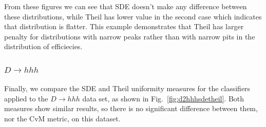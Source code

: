 From these figures we can see that SDE doesn't make any difference between these distributions, while Theil has lower value in the second case 
which indicates that distribution is flatter. This example demonstrates that Theil has larger penalty for distributions with narrow peaks rather than with narrow pits in the distribution of efficiecies.

\subsubsection*{$D \to hhh$}
Finally, we compare the SDE and Theil uniformity measures for the classifiers applied to the $D \to hhh$ data set, as shown in Fig.~\ref{fig:d2hhhsdetheil}.
Both measures show similar results, so there is no significant difference between them, nor the CvM metric, on this dataset.

